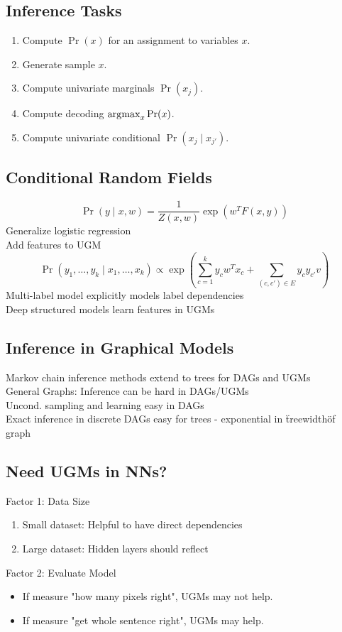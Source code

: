 \subsection*{Inference Tasks}
\begin{enumerate}
    \item Compute $\Pr(x)$ for an assignment to variables $x$.
    \item Generate sample $x$.
    \item Compute univariate marginals $\Pr(x_j)$.
    \item Compute decoding $\operatorname*{\arg\!\max}_x\Pr(x)$.
    \item Compute univariate conditional $\Pr(x_j\mid x_{j'})$.
\end{enumerate}
\subsection*{Conditional Random Fields}
\[\Pr(y\mid x,w)=\frac{1}{Z(x,w)}\exp(w^T F(x,y))\]
Generalize logistic regression\\
Add features to UGM\\
\[\Pr(y_1,\dots,y_k\mid x_1,\dots,x_k)
\propto \exp(\sum_{c=1}^k y_c w^T x_c + \sum_{(c,c')\in E}y_c y_{c'}v)\]
Multi-label model explicitly models label dependencies\\
Deep structured models learn features in UGMs
\subsection*{Inference in Graphical Models}
Markov chain inference methods extend to trees for DAGs and UGMs\\
General Graphs: Inference can be hard in DAGs/UGMs\\
Uncond. sampling and learning easy in DAGs\\
Exact inference in discrete DAGs easy for trees - exponential in \"treewidth\" of graph
\subsection*{Need UGMs in NNs?}
Factor 1: Data Size
\begin{enumerate}
    \item Small dataset: Helpful to have direct dependencies
    \item Large dataset: Hidden layers should reflect
\end{enumerate}
Factor 2: Evaluate Model
\begin{itemize}
    \item If measure "how many pixels right", UGMs may not help.
    \item If measure "get whole sentence right", UGMs may help.
\end{itemize}